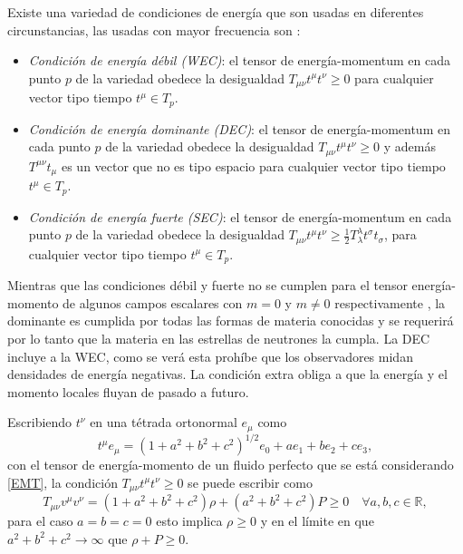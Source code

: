 Existe una variedad de condiciones de energía que son usadas en diferentes circunstancias, las usadas con mayor frecuencia son \cite{Hawking1973,Carroll2003}:

\begin{itemize}[leftmargin=1.5cm]
    \item \emph{Condición de energía débil (WEC)}: el tensor de energía-momentum en cada punto $p$ de la variedad obedece la desigualdad $T_{\mu \nu} t^{\mu} t^{\nu} \geq 0$ para cualquier vector tipo tiempo $t^{\mu}\in T_{p}$.
    \item \emph{Condición de energía dominante (DEC)}: el tensor de energía-momentum en cada punto $p$ de la variedad obedece la desigualdad $T_{\mu \nu} t^{\mu} t^{\nu} \geq 0$ y además $T^{\mu \nu} t_{\mu}$ es un vector que no es tipo espacio para cualquier vector tipo tiempo $t^{\mu}\in T_{p}$.
    \item \emph{Condición de energía fuerte (SEC)}: el tensor de energía-momentum en cada punto $p$ de la variedad obedece la desigualdad $T_{\mu \nu} t^{\mu} t^{\nu} \geq \frac{1}{2} T_{\lambda}^{\lambda} t^{\sigma} t_{\sigma}$, para cualquier vector tipo tiempo $t^{\mu}\in T_{p}$.
\end{itemize}
Mientras que las condiciones débil y fuerte no se cumplen para el tensor energía-momento de algunos campos escalares con $m=0$ y $m\neq 0$ respectivamente \cite{Hawking1973}, la dominante es cumplida por todas las formas de materia conocidas y se requerirá por lo tanto que la materia en las estrellas de neutrones la cumpla. La DEC incluye a la WEC, como se verá esta prohíbe que los observadores midan densidades de energía negativas. La condición extra obliga a que la energía y el momento locales fluyan de pasado a futuro.

Escribiendo $t^\nu$ en una tétrada ortonormal $e_{\mu}$ como
\begin{equation}
    t^{\mu} e_{\mu}= \left(1+a^{2}+b^{2}+c^{2}\right)^{1 / 2} e_{0}+a e_{1}+b e_{2}+c e_{3},
\end{equation}
con el tensor de energía-momento de un fluido perfecto que se está considerando \eqref{EMT}, la condición $T_{\mu \nu} t^{\mu} t^{\nu} \geq 0$ se puede escribir como
\begin{equation}
T_{\mu \nu} v^{\mu} v^{\nu}=\left(1+a^{2}+b^{2}+c^{2}\right) \rho + \left( a^{2} +b^{2} +c^{2} \right) P \geq 0 \quad \forall a,b,c \in \mathbb{R},
\end{equation}
para el caso $a=b=c=0$ esto implica $\rho \geq 0$ y en el límite en que $a^2+b^2+c^2 \to \infty$ que $\rho + P \geq 0$.

